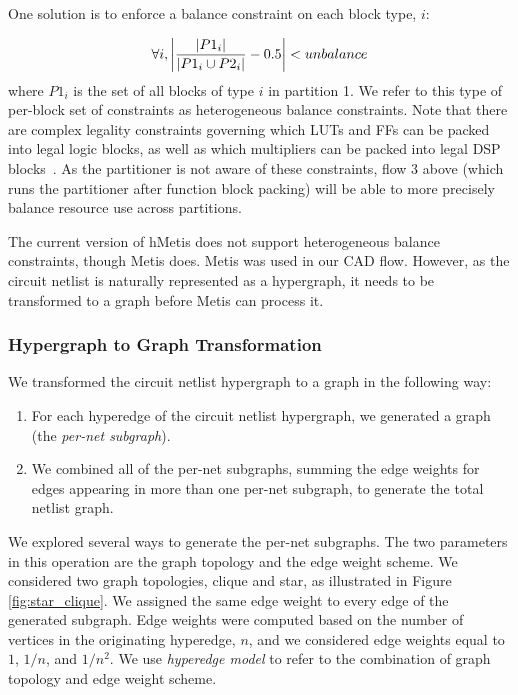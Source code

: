 One solution is to enforce a balance constraint on each block type, $i$:

\begin{equation}
\forall i, \abs*{ \frac{| P1_i |}{|P1_i \cup P2_i |} - 0.5} < unbalance
\end{equation}
where $P1_i$ is the set of all blocks of type $i$ in partition 1. We refer to this type of per-block set of constraints as heterogeneous balance constraints. Note that there are complex legality constraints governing which LUTs and FFs can be packed into legal logic blocks, as well as which multipliers can be packed into legal DSP blocks~\cite{luu2014vtr}. As the partitioner is not aware of these constraints, flow 3 above (which runs the partitioner after function block packing) will be able to more precisely balance resource use across partitions.

The current version of hMetis does not support heterogeneous balance constraints, though Metis does. Metis was used in our CAD flow. However, as the circuit netlist is naturally represented as a hypergraph, it needs to be transformed to a graph before Metis can process it.

\subsubsection{Hypergraph to Graph Transformation}\label{sec:hypergraph_to_graph}
We transformed the circuit netlist hypergraph to a graph in the following way:
\begin{enumerate}
\item For each hyperedge of the circuit netlist hypergraph, we generated a graph (the \emph{per-net subgraph}).
\item We combined all of the per-net subgraphs, summing the edge weights for edges appearing in more than one per-net subgraph, to generate the total netlist graph.
\end{enumerate}

We explored several ways to generate the per-net subgraphs. The two parameters in this operation are the graph topology and the edge weight scheme. We considered two graph topologies, clique and star, as illustrated in Figure \ref{fig:star_clique}. We assigned the same edge weight to every edge of the generated subgraph. Edge weights were computed based on the number of vertices in the originating hyperedge, $n$, and we considered edge weights equal to $1$, $1/n$, and $1/n^2$. We use \emph{hyperedge model} to refer to the combination of graph topology and edge weight scheme.


